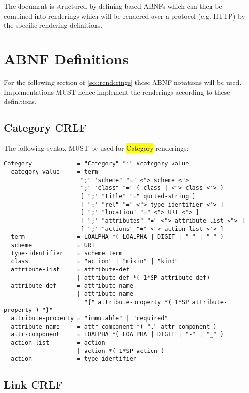\documentclass[10pt,a4paper]{article}
\begin{document}
The document is structured by defining based ABNFs which can then be combined into renderings which will be rendered over a protocol (e.g. HTTP) by the specific rendering definitions.

\section{ABNF Definitions}

For the following section of \ref{sec:renderings} these ABNF notations will be used. Implementations MUST hence implement the renderings according to these definitions.

\subsection{Category CRLF}

The following syntax MUST be used for \hl{Category} renderings:

\begin{verbatim}
Category             = "Category" ":" #category-value
  category-value     = term
                      ";" "scheme" "=" <"> scheme <">
                      ";" "class" "=" ( class | <"> class <"> )
                      [ ";" "title" "=" quoted-string ]
                      [ ";" "rel" "=" <"> type-identifier <"> ]
                      [ ";" "location" "=" <"> URI <"> ]
                      [ ";" "attributes" "=" <"> attribute-list <"> ]
                      [ ";" "actions" "=" <"> action-list <"> ]
  term               = LOALPHA *( LOALPHA | DIGIT | "-" | "_" )
  scheme             = URI
  type-identifier    = scheme term
  class              = "action" | "mixin" | "kind"
  attribute-list     = attribute-def
                     | attribute-def *( 1*SP attribute-def)
  attribute-def      = attribute-name
                     | attribute-name
                       "{" attribute-property *( 1*SP attribute-property ) "}"
  attribute-property = "immutable" | "required"
  attribute-name     = attr-component *( "." attr-component )
  attr-component     = LOALPHA *( LOALPHA | DIGIT | "-" | "_" )
  action-list        = action
                     | action *( 1*SP action )
  action             = type-identifier
\end{verbatim}

\subsection{Link CRLF}
\end{document}
